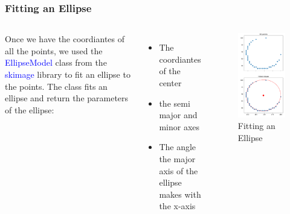 \documentclass{beamer}
\begin{document}
\begin{frame}
    \frametitle{Fitting an Ellipse}
    \begin{columns}
        Once we have the coordiantes of all the points, we used the \textcolor{blue}{EllipseModel} class from the \textcolor{blue}{skimage} library to fit an ellipse to the points. The class fits an ellipse and return the parameters of the ellipse:
        \begin{itemize}
            \item The coordiantes of the center
            \item the semi major and minor axes
            \item The angle the major axis of the ellipse makes with the x-axis
        \end{itemize}
        \pause
        \begin{figure}
            \centering
            \includegraphics[scale=0.5]{ellipse_fit.png}
            \caption[]{Fitting an Ellipse}
        \end{figure}
    \end{columns}
\end{frame}
\end{document}
